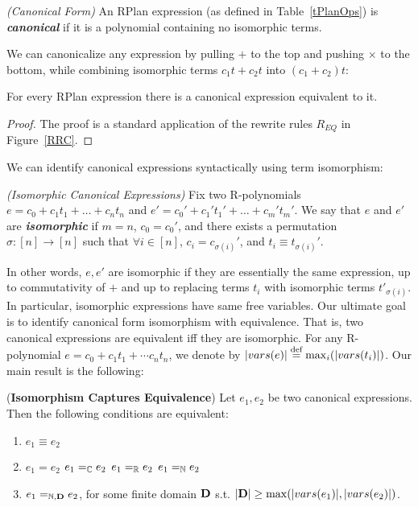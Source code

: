 \begin{defn}{\em (Canonical Form)} An RPlan expression (as defined in Table~\ref{tPlanOps}) is {\em \textbf{canonical}} if it is a polynomial containing no isomorphic terms. 
\end{defn}{}

We can canonicalize any expression by pulling $+$ to the top and pushing $\times$ to the bottom, while combining isomorphic terms $c_1 t + c_2 t$ into $(c_1 + c_2) t$: 

\begin{lmm}\label{lCanonPreservesSemantics}
For every RPlan expression there is a canonical expression equivalent to it. 
\end{lmm}{}
\begin{proof}
The proof is a standard application of the rewrite rules $R_{EQ}$ in Figure~\ref{RRC}. 
\end{proof}{}

We can identify canonical expressions syntactically using term isomorphism: 

\begin{defn}{\em (Isomorphic Canonical Expressions)} 
  Fix two R-polynomials $e = c_0 + c_1 t_1 + \dots + c_n t_n$ and $e' = c_0' + c_1' t_1' + \dots + c_m' t_m'$.  We say that $e$ and $e'$ are \emph{\textbf{isomorphic}} if $m=n$, $c_0=c_0'$, and there exists a permutation $\sigma: [n] \rightarrow [n]$ such that $\forall i \in [n]$, $c_i = c_{\sigma(i)}'$, and $t_i \equiv t_{\sigma(i)}'$.
\end{defn}{}

In other words, $e, e'$ are isomorphic if they are essentially the same expression, up to commutativity of $+$ and up to replacing terms $t_i$ with isomorphic terms $t'_{\sigma(i)}$.  In particular,  isomorphic expressions have same free variables.
Our ultimate goal is to identify canonical form isomorphism with equivalence. That is, two canonical expressions are equivalent iff they are isomorphic. For any R-polynomial $e = c_0 + c_1t_1 + \cdots c_nt_n$, we denote by $|vars(e)| \stackrel{\text{def}}{=} \max_i(|vars(t_i)|)$.  Our main result is the following:

\begin{thm}{(\textbf{Isomorphism Captures Equivalence})}\label{lemma:unique:nf} Let $e_1, e_2$ be two  canonical expressions.  Then the following conditions are equivalent:
  \begin{enumerate}
\itemsep0em
  \item \label{item:1} $e_1 \equiv e_2$ 
  \item \label{item:2} $e_1 = e_2$
  \inlineitem \label{item:3} $e_1 =_\mathbb C e_2$
  \inlineitem \label{item:4} $e_1 =_\mathbb R e_2$
  \inlineitem \label{item:5} $e_1 =_\mathbb N e_2$
  \item \label{item:6} $e_1 =_{\mathbb N, \mathbf D} e_2$, for some finite domain $\mathbf D$ s.t. $|\mathbf D| \geq \max(|vars(e_1)|, |vars(e_2)|)$. 
  \end{enumerate}
\end{thm}{}

